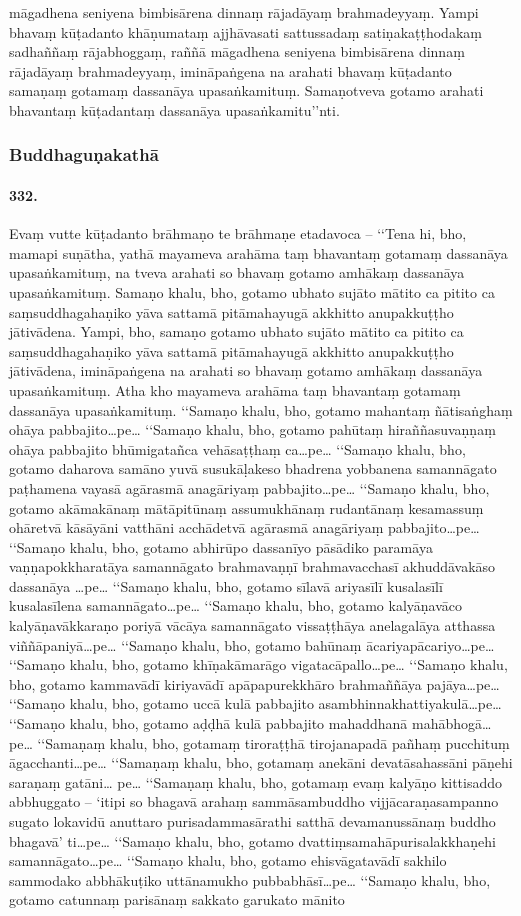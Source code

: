 māgadhena seniyena bimbisārena dinnaṃ rājadāyaṃ brahmadeyyaṃ. Yampi bhavaṃ kūṭadanto khāṇumataṃ ajjhāvasati sattussadaṃ satiṇakaṭṭhodakaṃ sadhaññaṃ rājabhoggaṃ, raññā māgadhena seniyena bimbisārena dinnaṃ rājadāyaṃ brahmadeyyaṃ, imināpaṅgena na arahati bhavaṃ kūṭadanto samaṇaṃ gotamaṃ dassanāya upasaṅkamituṃ. Samaṇotveva gotamo arahati bhavantaṃ kūṭadantaṃ dassanāya upasaṅkamitu’’nti.

\subsubsection{Buddhaguṇakathā}

\paragraph{332.} Evaṃ vutte kūṭadanto brāhmaṇo te brāhmaṇe etadavoca – ‘‘Tena hi, bho, mamapi suṇātha, yathā mayameva arahāma taṃ bhavantaṃ gotamaṃ dassanāya upasaṅkamituṃ, na tveva arahati so bhavaṃ gotamo amhākaṃ dassanāya upasaṅkamituṃ. Samaṇo khalu, bho, gotamo ubhato sujāto mātito ca pitito ca saṃsuddhagahaṇiko yāva sattamā pitāmahayugā akkhitto anupakkuṭṭho jātivādena. Yampi, bho, samaṇo gotamo ubhato sujāto mātito ca pitito ca saṃsuddhagahaṇiko yāva sattamā pitāmahayugā akkhitto anupakkuṭṭho jātivādena, imināpaṅgena na arahati so bhavaṃ gotamo amhākaṃ dassanāya upasaṅkamituṃ. Atha kho mayameva arahāma taṃ bhavantaṃ gotamaṃ dassanāya upasaṅkamituṃ. ‘‘Samaṇo khalu, bho, gotamo mahantaṃ ñātisaṅghaṃ ohāya pabbajito…pe… ‘‘Samaṇo khalu, bho, gotamo pahūtaṃ hiraññasuvaṇṇaṃ ohāya pabbajito bhūmigatañca vehāsaṭṭhaṃ ca…pe… ‘‘Samaṇo khalu, bho, gotamo daharova samāno yuvā susukāḷakeso bhadrena yobbanena samannāgato paṭhamena vayasā agārasmā anagāriyaṃ pabbajito…pe… ‘‘Samaṇo khalu, bho, gotamo akāmakānaṃ mātāpitūnaṃ assumukhānaṃ rudantānaṃ kesamassuṃ ohāretvā kāsāyāni vatthāni acchādetvā agārasmā anagāriyaṃ pabbajito…pe… ‘‘Samaṇo khalu, bho, gotamo abhirūpo dassanīyo pāsādiko paramāya vaṇṇapokkharatāya samannāgato brahmavaṇṇī brahmavacchasī akhuddāvakāso dassanāya …pe… ‘‘Samaṇo khalu, bho, gotamo sīlavā ariyasīlī kusalasīlī kusalasīlena samannāgato…pe… ‘‘Samaṇo khalu, bho, gotamo kalyāṇavāco kalyāṇavākkaraṇo poriyā vācāya samannāgato vissaṭṭhāya anelagalāya atthassa viññāpaniyā…pe… ‘‘Samaṇo khalu, bho, gotamo bahūnaṃ ācariyapācariyo…pe… ‘‘Samaṇo khalu, bho, gotamo khīṇakāmarāgo vigatacāpallo…pe… ‘‘Samaṇo khalu, bho, gotamo kammavādī kiriyavādī apāpapurekkhāro brahmaññāya pajāya…pe… ‘‘Samaṇo khalu, bho, gotamo uccā kulā pabbajito asambhinnakhattiyakulā…pe… ‘‘Samaṇo khalu, bho, gotamo aḍḍhā kulā pabbajito mahaddhanā mahābhogā…pe… ‘‘Samaṇaṃ khalu, bho, gotamaṃ tiroraṭṭhā tirojanapadā pañhaṃ pucchituṃ āgacchanti…pe… ‘‘Samaṇaṃ khalu, bho, gotamaṃ anekāni devatāsahassāni pāṇehi saraṇaṃ gatāni… pe… ‘‘Samaṇaṃ khalu, bho, gotamaṃ evaṃ kalyāṇo kittisaddo abbhuggato – ‘itipi so bhagavā arahaṃ sammāsambuddho vijjācaraṇasampanno sugato lokavidū anuttaro purisadammasārathi satthā devamanussānaṃ buddho bhagavā’ ti…pe… ‘‘Samaṇo khalu, bho, gotamo dvattiṃsamahāpurisalakkhaṇehi samannāgato…pe… ‘‘Samaṇo khalu, bho, gotamo ehisvāgatavādī sakhilo sammodako abbhākuṭiko uttānamukho pubbabhāsī…pe… ‘‘Samaṇo khalu, bho, gotamo catunnaṃ parisānaṃ sakkato garukato mānito 